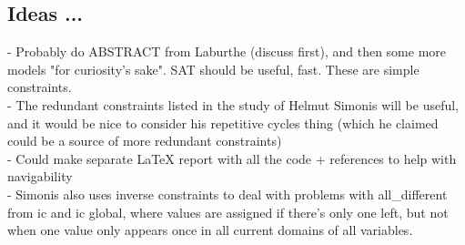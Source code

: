 \subsection{Ideas ...}

 - Probably do ABSTRACT from Laburthe (discuss first), and then some more models "for curiosity's sake". SAT should be useful, fast. These are simple constraints.\\
 - The redundant constraints listed in the study of Helmut Simonis will be useful, and it would be nice to consider his repetitive cycles thing (which he claimed could be a source of more redundant constraints)\\
 - Could make separate LaTeX report with all the code + references to help with navigability\\
 - Simonis also uses inverse constraints to deal with problems with all\_different from ic and ic global, where values are assigned if there's only one left, but not when one value only appears once in all current domains of all variables.